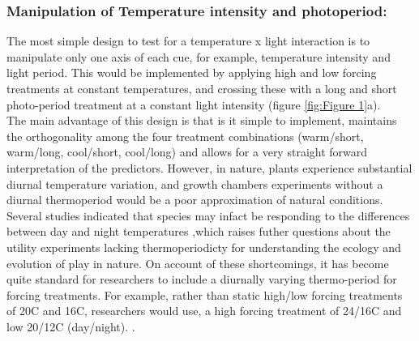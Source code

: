 \documentclass[12pt]{article}\usepackage[]{graphicx}\usepackage[]{color}
\begin{document}
\subsubsection*{Manipulation of Temperature intensity and photoperiod:}
\indent \indent The most simple design to test for a temperature x light interaction is to manipulate only one axis of each cue, for example, temperature intensity and light period. This would be implemented by applying high and low forcing treatments at constant temperatures, and crossing these with a long and short photo-period treatment at a constant light intensity (figure \ref{fig:Figure 1}a).\\
\indent The main advantage of this design is that is it simple to implement, maintains the orthogonality among the four treatment combinations (warm/short, warm/long, cool/short, cool/long) and allows for a very straight forward interpretation of the predictors. However, in nature, plants experience substantial diurnal temperature variation, and growth chambers experiments without a diurnal thermoperiod would be a poor approximation of natural conditions. Several studies indicated that species may infact be responding to the differences between day and night temperatures \citep{Erwin1995},which raises futher questions about the utility experiments lacking thermoperiodicty for understanding the ecology and evolution of play in nature. On account of these shortcomings, it has become quite standard for researchers to include a diurnally varying thermo-period for forcing treatments. For example, rather than static high/low forcing treatments of 20\degree C and 16\degree C, researchers would use, a high forcing treatment of 24\degree/16\degree C and low 20\degree/12\degree C (day/night). \citep{Ettinger_inprep}.
\end{document}
